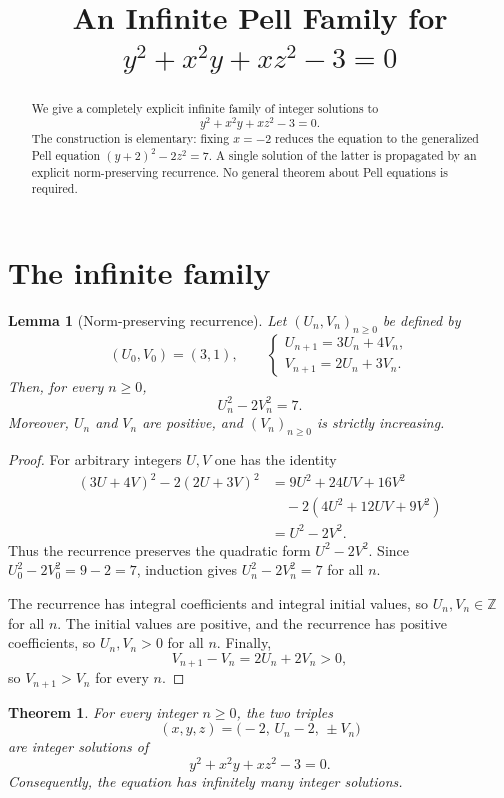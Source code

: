 \documentclass[11pt]{article}
\title{An Infinite Pell Family for
\texorpdfstring{$y^2+x^2y+xz^2-3=0$}{y2 + x2 y + x z2 - 3 = 0}}
\author{}
\date{}
\newtheorem{theorem}{Theorem}
\newtheorem{lemma}{Lemma}
\theoremstyle{remark}
\newcommand{\Z}{\mathbb Z}
\begin{document}
\maketitle
\vspace{-2.2em}

\begin{abstract}
We give a completely explicit infinite family of integer solutions to
\[
 y^2+x^2y+xz^2-3=0.
\]
The construction is elementary: fixing $x=-2$ reduces the equation to the generalized Pell equation
$(y+2)^2-2z^2=7$.  A single solution of the latter is propagated by an explicit norm-preserving recurrence.  No general theorem about Pell equations is required.
\end{abstract}

\section{The infinite family}

\begin{lemma}[Norm-preserving recurrence]\label{lem:recurrence}
Let $(U_n,V_n)_{n\geq 0}$ be defined by
\[
 (U_0,V_0)=(3,1),
 \qquad
 \begin{cases}
 U_{n+1}=3U_n+4V_n,\\
 V_{n+1}=2U_n+3V_n.
 \end{cases}
\]
Then, for every $n\geq 0$,
\[
 U_n^2-2V_n^2=7.
\]
Moreover, $U_n$ and $V_n$ are positive, and $(V_n)_{n\geq0}$ is strictly increasing.
\end{lemma}

\begin{proof}
For arbitrary integers $U,V$ one has the identity
\begin{align*}
 (3U+4V)^2-2(2U+3V)^2
 &=9U^2+24UV+16V^2 \\
 &\quad{}-2(4U^2+12UV+9V^2)\\
 &=U^2-2V^2.
\end{align*}
Thus the recurrence preserves the quadratic form $U^2-2V^2$.  Since
$U_0^2-2V_0^2=9-2=7$, induction gives $U_n^2-2V_n^2=7$ for all $n$.

The recurrence has integral coefficients and integral initial values, so $U_n,V_n\in\Z$ for all $n$.  The initial values are positive, and the recurrence has positive coefficients, so $U_n,V_n>0$ for all $n$.  Finally,
\[
 V_{n+1}-V_n=2U_n+2V_n>0,
\]
so $V_{n+1}>V_n$ for every $n$.
\end{proof}

\begin{theorem}\label{thm:main}
For every integer $n\geq0$, the two triples
\[
 \boxed{(x,y,z)=\bigl(-2,\,U_n-2,\,\pm V_n\bigr)}
\]
are integer solutions of
\[
 y^2+x^2y+xz^2-3=0.
\]
Consequently, the equation has infinitely many integer solutions.
\end{theorem}
\end{document}
